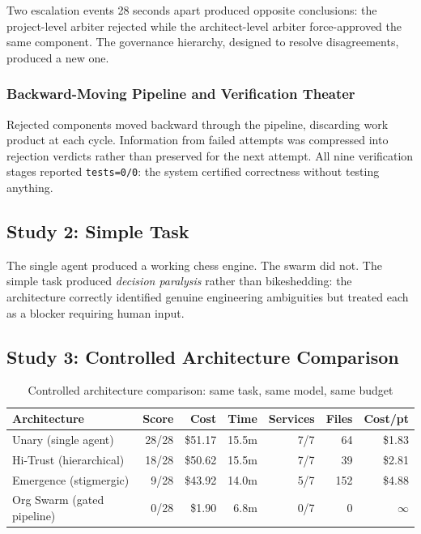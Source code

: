 \documentclass[11pt,a4paper]{article}
\begin{document}
Two escalation events 28 seconds apart produced opposite conclusions: the project-level arbiter rejected while the architect-level arbiter force-approved the same component. The governance hierarchy, designed to resolve disagreements, produced a new one.

\subsubsection{Backward-Moving Pipeline and Verification Theater}

Rejected components moved backward through the pipeline, discarding work product at each cycle. Information from failed attempts was compressed into rejection verdicts rather than preserved for the next attempt. All nine verification stages reported \texttt{tests=0/0}: the system certified correctness without testing anything.

\subsection{Study 2: Simple Task}

The single agent produced a working chess engine. The swarm did not. The simple task produced \emph{decision paralysis} rather than bikeshedding: the architecture correctly identified genuine engineering ambiguities but treated each as a blocker requiring human input.

\subsection{Study 3: Controlled Architecture Comparison}
\label{sec:arch-comparison}

\begin{table}[H]
\centering
\caption{Controlled architecture comparison: same task, same model, same budget}
\label{tab:arch-comparison}
\small
\begin{tabular}{@{}p{2.5cm}rrrrrr@{}}
\toprule
\textbf{Architecture} & \textbf{Score} & \textbf{Cost} & \textbf{Time} & \textbf{Services} & \textbf{Files} & \textbf{Cost/pt} \\
\midrule
Unary (single agent) & 28/28 & \$51.17 & 15.5m & 7/7 & 64 & \$1.83 \\
Hi-Trust (hierarchical) & 18/28 & \$50.62 & 15.5m & 7/7 & 39 & \$2.81 \\
Emergence (stigmergic) & 9/28 & \$43.92 & 14.0m & 5/7 & 152 & \$4.88 \\
Org Swarm (gated pipeline) & 0/28 & \$1.90 & 6.8m & 0/7 & 0 & $\infty$ \\
\bottomrule
\end{tabular}
\end{table}
\end{document}
